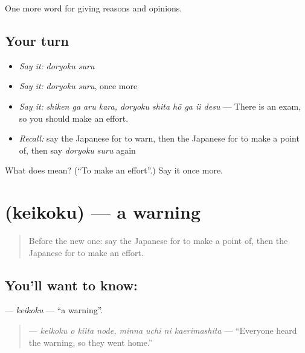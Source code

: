 \begin{grammarlens}[title={What you've built}]
One more word for giving reasons and opinions.
\end{grammarlens}

\subsection*{Your turn}
\begin{itemize}
\raggedright
  \item \emph{Say it:} \emph{doryoku suru}
  \item \emph{Say it:} \emph{doryoku suru}, once more
  \item \emph{Say it:} \emph{shiken ga aru kara, doryoku shita hō ga ii desu} — There is an exam, so you should make an effort.
  \item \emph{Recall:} say the Japanese for to warn, then the Japanese for to make a point of, then say \emph{doryoku suru} again
\end{itemize}

\begin{tcolorbox}[breakable,colback=teal!4,colframe=teal!35!black,title={Before you move on}]
What does  mean? (\textquotedblleft{}To make an effort\textquotedblright{}.) Say it once more.
\end{tcolorbox}
\section[\texorpdfstring{\ja{けいこく} (keikoku)}{けいこく (keikoku)}]{ (keikoku) — a warning}

\label{lesson:JA-C340-keikoku}



\begin{quote}
Before the new one: say the Japanese for to make a point of, then the Japanese for to make an effort.
\end{quote}

\subsection*{You'll want to know: }
\textbf{} — \emph{keikoku} — \textquotedblleft{}a warning\textquotedblright{}.

\begin{quote}
\textbf{   } — \emph{keikoku o kiita node, minna uchi ni kaerimashita} — \textquotedblleft{}Everyone heard the warning, so they went home.\textquotedblright{}
\end{quote}

